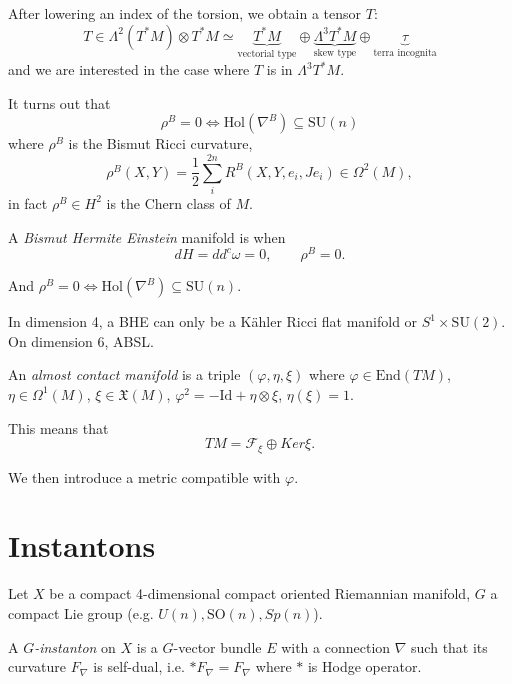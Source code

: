 After lowering an index of the torsion,
we obtain a tensor $T$:
$$
T \in \Lambda^2(T^*M) \otimes T^*M
\simeq \underbrace{T^*M}_{\text{vectorial
type}} \oplus\underbrace{\Lambda^3T^*M}_{
\text{skew type}}
\oplus \underbrace{\tau}_{\text{
terra incognita}}
$$
and we are interested in the case
where $T$ is in $\Lambda^3T^*M$.

\medskip\noindent
It turns out that
$$
\rho^B=0 \iff
\text{Hol}(\nabla^B) \subseteq
\text{SU}(n)
$$
where $\rho^B$ is the
Bismut Ricci curvature,
$$
\rho^B(X,Y)
=\frac{1}{2}\sum_i^{2n}
R^B(X,Y,e_i,J e_i)
\in \Omega^2(M),
$$
in fact $\rho^B \in H^2$ is
the Chern class of $M$.

\begin{definition}
\label{definition-bismut-hermite-einstein}
A {\it Bismut Hermite Einstein} manifold
is when
$$
dH=d d^c\omega=0,\qquad
\rho^B=0.
$$
\end{definition}

\noindent
And $\rho^B=0 \iff \text{Hol}(\nabla^B)
\subseteq \text{SU}(n)$.

\medskip\noindent
In dimension 4, a BHE
can only be a Kähler Ricci flat manifold
or $S^1 \times \text{SU}(2)$. On
dimension 6, ABSL.

\begin{definition}
\label{definition-almost-contact}
An {\it almost contact manifold}
is a triple $(\varphi,\eta,\xi)$
where $\varphi \in \text{End}(TM)$,
$\eta \in \Omega^1(M)$,
$\xi \in \mathfrak{X}(M)$,
$\varphi^2 = -\text{Id} + \eta \otimes \xi$,
$\eta(\xi)=1$.
\end{definition}

\noindent
This means that
$$
TM = \mathcal{F}_{\xi}\oplus Ker\xi.
$$

We then introduce a metric
compatible with $\varphi$.




\section{Instantons}
\label{section-instantons}

\noindent
Let $X$ be a compact 4-dimensional compact
oriented Riemannian manifold, $G$ a compact
Lie group (e.g. $U(n), \text{SO}(n),Sp(n)$).

\begin{definition}
\label{definition-g-instanton}
A {\it $G$-instanton} on $X$
is a $G$-vector bundle $E$
with a connection $\nabla$ such that its
curvature $F_{\nabla}$ is self-dual, i.e.
$*F_{\nabla}=F_{\nabla}$
where $*$ is Hodge operator.
\end{definition}

